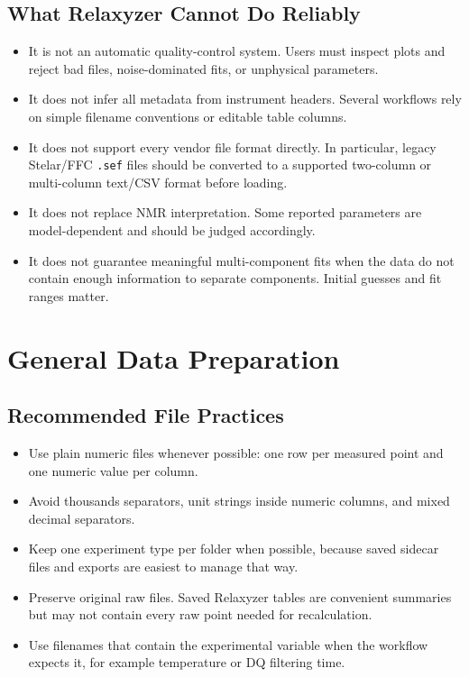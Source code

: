\documentclass[11pt,a4paper]{article}
\newcommand{\Relaxyzer}{Relaxyzer}
\begin{document}
\subsection{What Relaxyzer Cannot Do Reliably}
\begin{itemize}
  \item It is not an automatic quality-control system. Users must inspect plots and reject bad files, noise-dominated fits, or unphysical parameters.
  \item It does not infer all metadata from instrument headers. Several workflows rely on simple filename conventions or editable table columns.
  \item It does not support every vendor file format directly. In particular, legacy Stelar/FFC \texttt{.sef} files should be converted to a supported two-column or multi-column text/CSV format before loading.
  \item It does not replace NMR interpretation. Some reported parameters are model-dependent and should be judged accordingly.
  \item It does not guarantee meaningful multi-component fits when the data do not contain enough information to separate components. Initial guesses and fit ranges matter.
\end{itemize}

\section{General Data Preparation}

\subsection{Recommended File Practices}
\begin{itemize}
  \item Use plain numeric files whenever possible: one row per measured point and one numeric value per column.
  \item Avoid thousands separators, unit strings inside numeric columns, and mixed decimal separators.
  \item Keep one experiment type per folder when possible, because saved sidecar files and exports are easiest to manage that way.
  \item Preserve original raw files. Saved \Relaxyzer{} tables are convenient summaries but may not contain every raw point needed for recalculation.
  \item Use filenames that contain the experimental variable when the workflow expects it, for example temperature or DQ filtering time.
\end{itemize}
\end{document}
